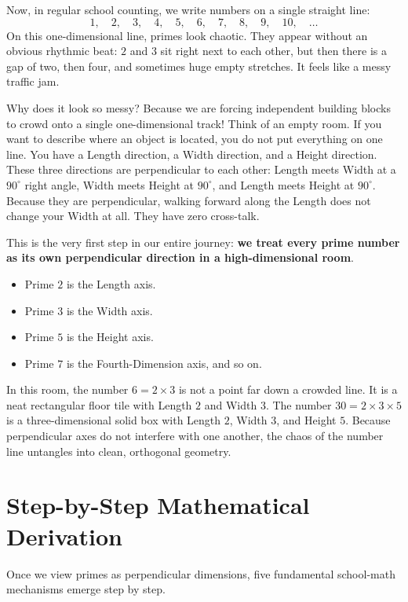 \documentclass[11pt,a4paper]{article}
\theoremstyle{definition}
\begin{document}
Now, in regular school counting, we write numbers on a single straight line:
\begin{equation}
1, \quad 2, \quad 3, \quad 4, \quad 5, \quad 6, \quad 7, \quad 8, \quad 9, \quad 10, \quad \dots
\end{equation}
On this one-dimensional line, primes look chaotic. They appear without an obvious rhythmic beat: $2$ and $3$ sit right next to each other, but then there is a gap of two, then four, and sometimes huge empty stretches. It feels like a messy traffic jam.

Why does it look so messy? Because we are forcing independent building blocks to crowd onto a single one-dimensional track! Think of an empty room. If you want to describe where an object is located, you do not put everything on one line. You have a Length direction, a Width direction, and a Height direction. These three directions are perpendicular to each other: Length meets Width at a $90^\circ$ right angle, Width meets Height at $90^\circ$, and Length meets Height at $90^\circ$. Because they are perpendicular, walking forward along the Length does not change your Width at all. They have zero cross-talk.

This is the very first step in our entire journey: \textbf{we treat every prime number as its own perpendicular direction in a high-dimensional room}.
\begin{itemize}
\item Prime $2$ is the Length axis.
\item Prime $3$ is the Width axis.
\item Prime $5$ is the Height axis.
\item Prime $7$ is the Fourth-Dimension axis, and so on.
\end{itemize}

In this room, the number $6 = 2 \times 3$ is not a point far down a crowded line. It is a neat rectangular floor tile with Length $2$ and Width $3$. The number $30 = 2 \times 3 \times 5$ is a three-dimensional solid box with Length $2$, Width $3$, and Height $5$. Because perpendicular axes do not interfere with one another, the chaos of the number line untangles into clean, orthogonal geometry.


\section{Step-by-Step Mathematical Derivation}

Once we view primes as perpendicular dimensions, five fundamental school-math mechanisms emerge step by step.
\end{document}
